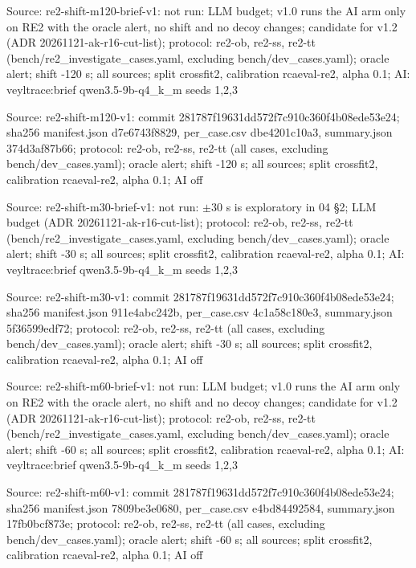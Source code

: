 \noindent Source: re2-shift-m120-brief-v1: not run: LLM budget; v1.0 runs the AI arm only on RE2 with the oracle alert, no shift and no decoy changes; candidate for v1.2 (ADR 20261121-ak-r16-cut-list); protocol: re2-ob, re2-ss, re2-tt (bench/\allowbreak{}re2\_investigate\_cases.yaml, excluding bench/\allowbreak{}dev\_cases.yaml); oracle alert; shift -120 s; all sources; split crossfit2, calibration rcaeval-re2, alpha 0.1; AI: veyltrace:brief qwen3.5-9b-q4\_k\_m seeds 1,2,3\par
\noindent Source: re2-shift-m120-v1: commit 281787f19631dd572f7c910c360f4b08ede53e24; sha256 manifest.json d7e6743f8829, per\_case.csv dbe4201c10a3, summary.json 374d3af87b66; protocol: re2-ob, re2-ss, re2-tt (all cases, excluding bench/\allowbreak{}dev\_cases.yaml); oracle alert; shift -120 s; all sources; split crossfit2, calibration rcaeval-re2, alpha 0.1; AI off\par
\noindent Source: re2-shift-m30-brief-v1: not run: $\pm$30 s is exploratory in 04 \S{}2; LLM budget (ADR 20261121-ak-r16-cut-list); protocol: re2-ob, re2-ss, re2-tt (bench/\allowbreak{}re2\_investigate\_cases.yaml, excluding bench/\allowbreak{}dev\_cases.yaml); oracle alert; shift -30 s; all sources; split crossfit2, calibration rcaeval-re2, alpha 0.1; AI: veyltrace:brief qwen3.5-9b-q4\_k\_m seeds 1,2,3\par
\noindent Source: re2-shift-m30-v1: commit 281787f19631dd572f7c910c360f4b08ede53e24; sha256 manifest.json 911e4abc242b, per\_case.csv 4c1a58c180e3, summary.json 5f36599edf72; protocol: re2-ob, re2-ss, re2-tt (all cases, excluding bench/\allowbreak{}dev\_cases.yaml); oracle alert; shift -30 s; all sources; split crossfit2, calibration rcaeval-re2, alpha 0.1; AI off\par
\noindent Source: re2-shift-m60-brief-v1: not run: LLM budget; v1.0 runs the AI arm only on RE2 with the oracle alert, no shift and no decoy changes; candidate for v1.2 (ADR 20261121-ak-r16-cut-list); protocol: re2-ob, re2-ss, re2-tt (bench/\allowbreak{}re2\_investigate\_cases.yaml, excluding bench/\allowbreak{}dev\_cases.yaml); oracle alert; shift -60 s; all sources; split crossfit2, calibration rcaeval-re2, alpha 0.1; AI: veyltrace:brief qwen3.5-9b-q4\_k\_m seeds 1,2,3\par
\noindent Source: re2-shift-m60-v1: commit 281787f19631dd572f7c910c360f4b08ede53e24; sha256 manifest.json 7809be3e0680, per\_case.csv e4bd84492584, summary.json 17fb0bcf873e; protocol: re2-ob, re2-ss, re2-tt (all cases, excluding bench/\allowbreak{}dev\_cases.yaml); oracle alert; shift -60 s; all sources; split crossfit2, calibration rcaeval-re2, alpha 0.1; AI off\par
